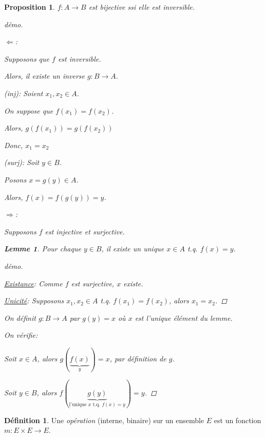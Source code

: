 \documentclass{report}
\newtheorem*{lem}{Lemme}
\newtheorem*{prop}{Proposition}
\theoremstyle{definition}
\newtheorem*{defin}{D\'efinition}
\theoremstyle{remark}
\begin{document}
	\begin{prop}
		$f:A \to B$ est bijective \emph{ssi} elle est inversible.

		\begin{proof}[d\'emo]
			~

			$\Leftarrow$:

			Supposons que $f$ est inversible.

			Alors, il existe un inverse $g:B \to A$.

			(inj): Soient $x_1,x_2 \in A$.

			On suppose que $f(x_1)=f(x_2)$.

			Alors, $g(f(x_1)) = g(f(x_2))$

			Donc, $x_1 = x_2$

			(surj): Soit $y \in B$.

			Posons $x=g(y) \in A$.

			Alors, $f(x)=f(g(y))=y$.

			$\Rightarrow$:

			Supposons $f$ est injective et surjective.

			\begin{lem}
				Pour \emph{chaque} $y \in B$, il existe un \emph{unique} $x \in A$ t.q. $f(x)=y$.

				\renewcommand{\qedsymbol}{$\blacksquare$}
				\begin{proof}[d\'emo]
					~

					\underline{Existance}:
					Comme $f$ est surjective, $x$ existe.

					\underline{Unicit\'e}:
					Supposons $x_1,x_2 \in A$ t.q. $f(x_1)=f(x_2)$, alors $x_1=x_2$.
				\end{proof}
				\renewcommand{\qedsymbol}{$\square$}
			\end{lem}

			On d\'efinit $g:B \to A$ par $g(y)=x$ o\`u $x$ est l'unique \'el\'ement du lemme.

			On v\'erifie:

			Soit $x \in A$, alors $g(\underbrace{f(x)}_y)=x$, par d\'efinition de $g$.

			Soit $y \in B$, alors $f(\underbrace{g(y)}_{\text{l'unique $x$ t.q. $f(x)=y$}})=y$.
		\end{proof}
	\end{prop}

	\begin{defin}
		Une \emph{op\'eration} (interne, binaire) sur un ensemble $E$ est un fonction $m:E \times E \to E$.
	\end{defin}
\end{document}
